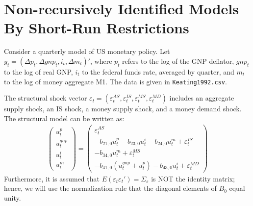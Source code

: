 \section[Non-recursively Identified Models By Short-Run Restrictions]{Non-recursively Identified Models By Short-Run Restrictions\label{ex:NonRecursivelyIdentifiedModelsShortRun}}
Consider a quarterly model of US monetary policy.
Let \(y_t=(\Delta p_t, \Delta gnp_t, i_t, \Delta m_t)'\),
where \(p_t\) refers to the log of the GNP deflator,
\(gnp_t\) to the log of real GNP,
\(i_t\) to the federal funds rate, averaged by quarter,
and \(m_t\) to the log of money aggregate M1. 
The data is given in \texttt{Keating1992.csv}.

The structural shock vector \(\varepsilon_t = (\varepsilon_t^{AS},\varepsilon_t^{IS},\varepsilon_t^{MS},\varepsilon_t^{MD})\)
includes an aggregate supply shock, an IS shock, a money supply shock, and a money demand shock.
The structural model can be written as:
\begin{align*}
\begin{pmatrix}
u_t^p\\u_t^{gnp}\\u_t^{i}\\u_t^m
\end{pmatrix} = 
\begin{pmatrix}
\varepsilon_{t}^{AS}\\
-b_{21,0}u_t^p - b_{23,0} u_t^i- b_{24,0}u_t^m +\varepsilon_{t}^{IS}\\
-b_{34,0}u_t^m + \varepsilon_{t}^{MS}\\
-b_{41,0}(u_t^{gnp}+u_t^p)-b_{43,0}u_t^i +\varepsilon_{t}^{MD}
\end{pmatrix}        
\end{align*}
Furthermore, it is assumed that \(E(\varepsilon_t \varepsilon_t')=\Sigma_\varepsilon\) is NOT the identity matrix;
hence, we will use the normalization rule that the diagonal elements of \(B_0\) equal unity.

